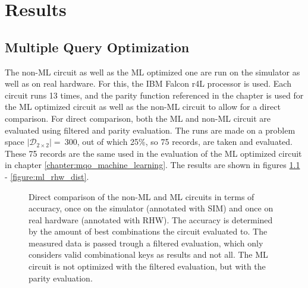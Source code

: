 \chapter{Results} %

\label{chapter:results} %

\def \resultboxplot {0.8}

\section{Multiple Query Optimization}
\label{chapter:results_mqo}

The non-ML circuit as well as the ML optimized one are run on the simulator as well as on real hardware. For this, the IBM Falcon r4L processor  is used. Each circuit runs 13 times, and the parity function referenced in the chapter  is used for the ML optimized circuit as well as the non-ML circuit to allow for a direct comparison. For direct comparison, both the ML and non-ML circuit are evaluated using filtered and parity evaluation. The runs are made on a problem space $\left|\mathcal{D}_{2\times2}\right| =\ 300$, out of which 25\%, so 75 records, are taken and evaluated. These 75 records are the same used in the evaluation of the ML optimized circuit in chapter \ref{chapter:mqo_machine_learning}. The results are shown in figures \ref{figure:comparison_ml_noml_filtered_acc} - \ref{figure:ml_rhw_dist}.

\begin{figure}[!h]
    \centering
    \scalebox{\resultboxplot}{
        
    }
    \caption{Direct comparison of the non-ML and ML circuits in terms of accuracy, once on the simulator (annotated with SIM) and once on real hardware (annotated with RHW). The accuracy is determined by the amount of best combinations the circuit evaluated to. The measured data is passed trough a filtered evaluation, which only considers valid combinational keys as results and not all. The ML circuit is not optimized with the filtered evaluation, but with the parity evaluation.}
    \label{figure:comparison_ml_noml_filtered_acc}
\end{figure}

\newpage

